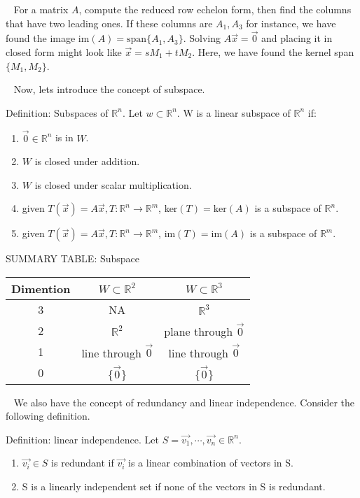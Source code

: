\documentclass[12pt]{article}
\begin{document}
$\,\,\,$ For a matrix $A$, compute the reduced row echelon form, then find the columns that have two leading ones. If these columns are $A_1,A_3$ for instance, we have found the image im$(A)=\text{span}\{A_1,A_3\}$. Solving $A\vec{x}=\vec{0}$ and placing it in closed form might look like $\vec{x}=sM_1+tM_2$. Here, we have found the kernel span$\{M_1,M_2\}$.

$\,\,\,$ Now, lets introduce the concept of subspace.

Definition: Subspaces of $\mathbb{R}^n$. Let $w\subset \mathbb{R}^n$. W is a linear subspace of $\mathbb{R}^n$ if:
\begin{enumerate}
\item $\vec{0}\in\mathbb{R}^n$ is in $W$.
\item $W$ is closed under addition.
\item $W$ is closed under scalar multiplication.
\item given $T(\vec{x})=A\vec{x},T:\mathbb{R}^n\rightarrow\mathbb{R}^m$, ker$(T)=\text{ker}(A)$ is a subspace of $\mathbb{R}^n$.
\item given $T(\vec{x})=A\vec{x},T:\mathbb{R}^n\rightarrow\mathbb{R}^m$, im$(T)=\text{im}(A)$ is a subspace of $\mathbb{R}^m$.
\end{enumerate}


\begin{center}
SUMMARY TABLE: Subspace
\end{center}

\begin{center}
\begin{tabular}{|c|c|c|}
\hline
Dimention & $W\subset\mathbb{R}^2$ & $W\subset\mathbb{R}^3$\\\hline
3 & NA & $\mathbb{R}^3$\\
2 & $\mathbb{R}^2$ & plane through $\vec{0}$\\
1 & line through $\vec{0}$ & line through $\vec{0}$\\
0 & $\{\vec{0}\}$ & $\{\vec{0}\}$\\\hline
\end{tabular}
\end{center}

$\,\,\,$ We also have the concept of redundancy and linear independence. Consider the following definition.

Definition: linear independence. Let $S=\vec{v_1},\cdots,\vec{v_n}\in\mathbb{R}^n$.
\begin{enumerate}
\item $\vec{v_i}\in S$ is redundant if $\vec{v_i}$ is a linear combination of vectors in S.
\item S is a linearly independent set if none of the vectors in S is redundant.
\end{enumerate}
\end{document}
